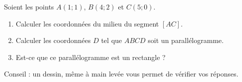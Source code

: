 
\begin{exercice}\label{exosmath-0507}

    Soient les points \( A(1;1)\), \( B(4;2)\) et \( C(5;0)\).
    \begin{enumerate}
        \item
            Calculer les coordonnées du milieu du segment \( [AC]\).
        \item
            Calculer les coordonnées \( D\) tel que \( ABCD\) soit un parallélogramme.
        \item
            Est-ce que ce parallélogramme est un rectangle ?
    \end{enumerate}
    Conseil : un dessin, même à main levée vous permet de vérifier vos réponses.

\end{exercice}
